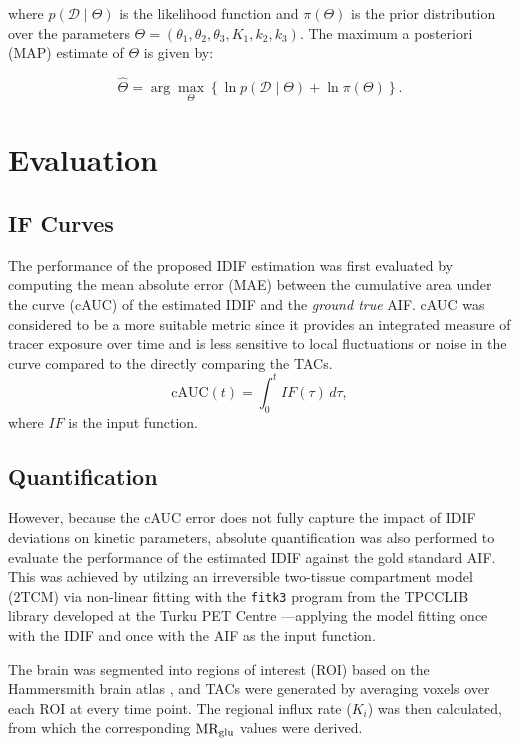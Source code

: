 where \( p(\mathcal{D} \mid \Theta) \) is the likelihood function and \( \pi(\Theta) \) is the prior distribution over the parameters \( \Theta = (\theta_{1}, \theta_{2}, \theta_{3}, K_{1}, k_{2}, k_{3}) \). The maximum a posteriori (MAP) estimate of \( \Theta \) is given by:

\begin{equation}
	\hat{\Theta}
	=
	\arg\max_{\Theta}
	\left\{
	\ln p(\mathcal{D} \mid \Theta)
	+
	\ln \pi(\Theta)
	\right\}.
\end{equation}

\section{Evaluation}
\subsection{IF Curves}
The performance of the proposed IDIF estimation was first evaluated by computing the mean absolute error (MAE) between the cumulative area under the curve (cAUC) of the estimated IDIF and the \textit{ground true} AIF. cAUC was considered to be a more suitable metric since it provides an integrated measure of tracer exposure over time and is less sensitive to local fluctuations or noise in the curve compared to the directly comparing the TACs.
\begin{equation}
	\textrm{cAUC}(t) =  \int_{0}^{t} IF(\tau) \, d\tau,
\end{equation}
where \(IF\) is the input function.

\subsection{Quantification}
However, because the cAUC error does not fully capture the impact of IDIF deviations on kinetic parameters, absolute quantification was also performed to evaluate the performance of the estimated IDIF against the gold standard AIF.
This was achieved by utilzing an irreversible two-tissue compartment model (2TCM) via non-linear fitting with the \texttt{fitk3} program from the TPCCLIB library developed at the Turku PET Centre \cite{oikonen2018tpcclib}—applying the model fitting once with the IDIF and once with the AIF as the input function.

The brain was segmented into regions of interest (ROI) based on the Hammersmith brain atlas \cite{hammers2003three}, and TACs were generated by averaging voxels over each ROI at every time point.
The regional influx rate (\(K_i\)) was then calculated, from which the corresponding \(\text{MR}_{\text{glu}}\) values were derived.

